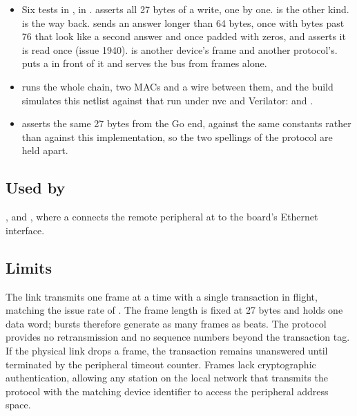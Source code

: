 \begin{itemize}
\item Six tests in , in
.
 asserts all 27 bytes of a
write, one by one.
 is the other
kind.
 is the way back.
 sends an answer longer than
64 bytes, once with bytes past 76 that look like a second answer and
once padded with zeros, and asserts it is read once (issue 1940).
 is another
device's frame and another protocol's.
 puts
a  in front of it and serves the bus from frames alone.
\item {} runs the whole chain, two MACs
and a wire between them, and the build simulates this netlist against
that run under nvc and Verilator:
and .
\item {} asserts the same 27 bytes
from the Go end, against the same constants rather than against this
implementation, so the two spellings of the protocol are held apart.
\end{itemize}

\subsection*{Used by}

, and , where a 
connects the remote peripheral at  to the board's
Ethernet interface.

\subsection*{Limits}

The link transmits one frame at a time with a single transaction in
flight, matching the issue rate of . The frame length is
fixed at 27 bytes and holds one data word; bursts therefore generate
as many frames as beats. The protocol provides no retransmission and
no sequence numbers beyond the transaction tag. If the physical link
drops a frame, the transaction remains unanswered until terminated by
the peripheral timeout counter. Frames lack cryptographic authentication,
allowing any station on the local network that transmits the protocol
with the matching device identifier to access the peripheral address space.
